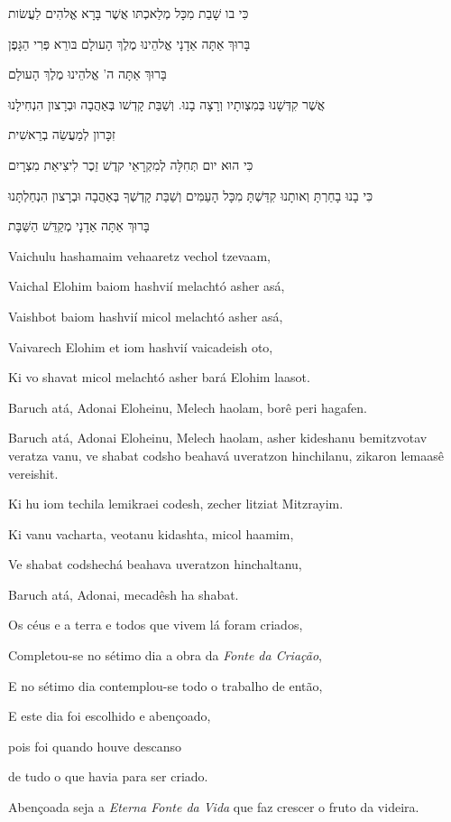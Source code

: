 כִּי בו שָׁבַת מִכָּל מְלַאכְתּו אֲשֶׁר בָּרָא אֱלהִים לַעֲשׂות

בָּרוּךְ אַתָּה אַדָנָי אֱלהֵינוּ מֶלֶךְ הָעולָם בּורֵא פְּרִי הַגָּפֶן

בָּרוּךְ אַתָּה ה' אֱלהֵינוּ מֶלֶךְ הָעולָם

אֲשֶׁר קִדְּשָׁנוּ בְּמִצְותָיו וְרָצָה בָנוּ. וְשַׁבַּת קָדְשׁו
בְּאַהֲבָה וּבְרָצון הִנְחִילָנוּ

זִכָּרון לְמַעֲשֵׂה בְרֵאשִׁית

כִּי הוּא יום תְּחִלָּה לְמִקְרָאֵי קדֶשׁ זֵכֶר לִיצִיאַת מִצְרָיִם

כִּי בָנוּ בָחַרְתָּ וְאותָנוּ קִדַּשְׁתָּ מִכָּל הָעַמִּים וְשַׁבַּת
קָדְשְׁךָ בְּאַהֲבָה וּבְרָצון הִנְחַלְתָּנוּ

בָּרוּךְ אַתָּה אַדָנָי מְקַדֵּשׁ הַשַּׁבָּת

Vaichulu hashamaim vehaaretz vechol tzevaam,

Vaichal Elohim baiom hashvií melachtó asher asá,

Vaishbot baiom hashvií micol melachtó asher asá,

Vaivarech Elohim et iom hashvií vaicadeish oto,

Ki vo shavat micol melachtó asher bará Elohim laasot.

Baruch atá, Adonai Eloheinu, Melech haolam, borê peri hagafen.

Baruch atá, Adonai Eloheinu, Melech haolam, asher kideshanu bemitzvotav
veratza vanu, ve shabat codsho beahavá uveratzon hinchilanu, zikaron
lemaasê vereishit.

Ki hu iom techila lemikraei codesh, zecher litziat Mitzrayim.

Ki vanu vacharta, veotanu kidashta, micol haamim,

Ve shabat codshechá beahava uveratzon hinchaltanu,

Baruch atá, Adonai, mecadêsh ha shabat.

Os céus e a terra e todos que vivem lá foram criados,

Completou-se no sétimo dia a obra da \emph{Fonte da Criação},

E no sétimo dia contemplou-se todo o trabalho de então,

E este dia foi escolhido e abençoado,

pois foi quando houve descanso

de tudo o que havia para ser criado.

Abençoada seja a \emph{Eterna Fonte da Vida} que faz crescer o fruto da
videira.

